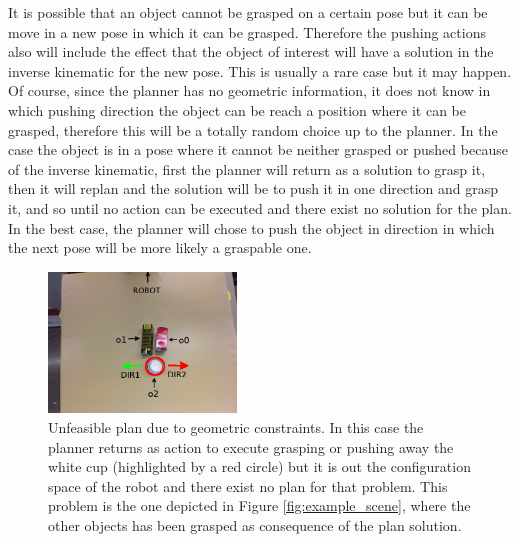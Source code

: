 It is possible that an object cannot be grasped on a certain pose but it can be move in a new pose in which it can be grasped. Therefore the pushing actions also will include the effect that the object of interest will have a solution in the inverse kinematic for the new pose. This is usually a rare case but it may happen. Of course, since the planner has no geometric information, it does not know in which pushing direction the object can be reach a position where it can be grasped, therefore this will be a totally random choice up to the planner. In the case the object is in a pose where it cannot be neither grasped or pushed because of the inverse kinematic, first the planner will return as a solution to grasp it, then it will replan and the solution will be to push it in one direction and grasp it, and so until no action can be executed and there exist no solution for the plan. In the best case, the planner will chose to push the object in direction in which the next pose will be more likely a graspable one. 


\begin{figure}[h]
\centering
\includegraphics[width=5cm]{Img/backtracking/image4.png}
\caption{Unfeasible plan due to geometric constraints. In this case the planner returns as action to execute grasping or pushing away the white cup (highlighted by a red circle) but it is out the configuration space of the robot and there exist no plan for that problem. This problem is the one depicted in Figure \ref{fig:example_scene}, where the other objects has been grasped as consequence of the plan solution.} \label{fig:backtracking1}
\end{figure}

